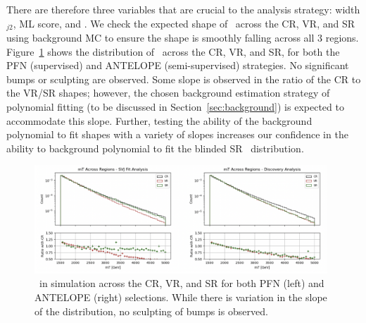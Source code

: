 There are therefore three variables that are crucial to the analysis strategy: width$_{j2}$, ML score, and \mt.
We check the expected shape of \mt~across the CR, VR, and SR using background MC to ensure the shape is smoothly falling across all 3 regions.
Figure~\ref{fig:crvrsr_mt} shows the distribution of \mt~across the CR, VR, and SR, for both the PFN (supervised) and ANTELOPE (semi-supervised) strategies.
No significant bumps or sculpting are observed.
Some slope is observed in the ratio of the CR to the VR/SR shapes; however, the chosen background estimation strategy of polynomial fitting (to be discussed in Section~\ref{sec:background}) is expected to accommodate this slope.
Further, testing the ability of the background polynomial to fit shapes with a variety of slopes increases our confidence in the ability to background polynomial to fit the blinded SR \mt~distribution.%
\begin{figure}[!htbp]
\centering
   \includegraphics[width=0.98\textwidth]{figures/eventsel/mT_regions}
    \caption{\mt~in simulation across the CR, VR, and SR for both PFN (left) and ANTELOPE (right) selections. While there is variation in the slope of the distribution, no sculpting of bumps is observed.
    \label{fig:crvrsr_mt}}
\end{figure}

